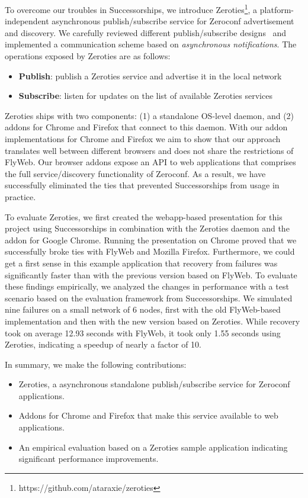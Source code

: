 To overcome our troubles in Successorships, we introduce Zeroties\footnote{https://github.com/ataraxie/zeroties}, a platform-independent asynchronous publish/subscribe service for Zeroconf advertisement and discovery.
We carefully reviewed different publish/subscribe designs~\cite{eugster_2003} and implemented a communication scheme based on \textit{asynchronous notifications}.
The operations exposed by Zeroties are as follows:
\begin{itemize}
    \item \textbf{Publish}: publish a Zeroties service and advertise it in the local network
    \item \textbf{Subscribe}: listen for updates on the list of available Zeroties services
\end{itemize}

Zeroties ships with two components: (1) a standalone OS-level daemon, and (2) addons for Chrome and Firefox that connect to this daemon.
With our addon implementations for Chrome and Firefox we aim to show that our approach translates well between different browsers and does not share the restrictions of FlyWeb.
Our browser addons expose an API to web applications that comprises the full service/discovery functionality of Zeroconf.
As a result, we have successfully eliminated the ties that prevented Successorships from usage in practice.

To evaluate Zeroties, we first created the webapp-based presentation for this project using Successorships in combination with the Zeroties daemon and the addon for Google Chrome.
Running the presentation on Chrome proved that we successfully broke ties with FlyWeb and Mozilla Firefox.
Furthermore, we could get a first sense in this example application that recovery from failures was significantly faster than with the previous version based on FlyWeb.
To evaluate these findings empirically, we analyzed the changes in performance with a test scenario based on the evaluation framework from Successorships.
We simulated nine failures on a small network of 6 nodes, first with the old FlyWeb-based implementation and then with the new version based on Zeroties.
While recovery took on average 12.93 seconds with FlyWeb, it took only 1.55 seconds using Zeroties, indicating a speedup of nearly a factor of 10.

In summary, we make the following contributions:
\begin{itemize}
    \item Zeroties, a asynchronous standalone publish/subscribe service for Zeroconf applications.
    \item Addons for Chrome and Firefox that make this service available to web applications.
    \item An empirical evaluation based on a Zeroties sample application indicating significant performance improvements.
\end{itemize}

